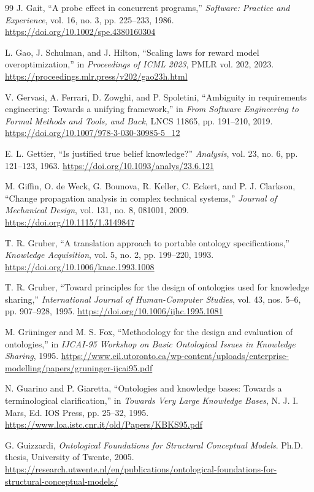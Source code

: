 \documentclass[10pt,a4paper]{article}
\begin{document}
\begin{thebibliography}{99}
J. Gait, ``A probe effect in concurrent programs,'' \emph{Software: Practice and Experience}, vol. 16, no. 3, pp. 225--233, 1986. \url{https://doi.org/10.1002/spe.4380160304}

L. Gao, J. Schulman, and J. Hilton, ``Scaling laws for reward model overoptimization,'' in \emph{Proceedings of ICML 2023}, PMLR vol. 202, 2023. \url{https://proceedings.mlr.press/v202/gao23h.html}

V. Gervasi, A. Ferrari, D. Zowghi, and P. Spoletini, ``Ambiguity in requirements engineering: Towards a unifying framework,'' in \emph{From Software Engineering to Formal Methods and Tools, and Back}, LNCS 11865, pp. 191--210, 2019. \url{https://doi.org/10.1007/978-3-030-30985-5_12}

E. L. Gettier, ``Is justified true belief knowledge?'' \emph{Analysis}, vol. 23, no. 6, pp. 121--123, 1963. \url{https://doi.org/10.1093/analys/23.6.121}

M. Giffin, O. de Weck, G. Bounova, R. Keller, C. Eckert, and P. J. Clarkson, ``Change propagation analysis in complex technical systems,'' \emph{Journal of Mechanical Design}, vol. 131, no. 8, 081001, 2009. \url{https://doi.org/10.1115/1.3149847}

T. R. Gruber, ``A translation approach to portable ontology specifications,'' \emph{Knowledge Acquisition}, vol. 5, no. 2, pp. 199--220, 1993. \url{https://doi.org/10.1006/knac.1993.1008}

T. R. Gruber, ``Toward principles for the design of ontologies used for knowledge sharing,'' \emph{International Journal of Human-Computer Studies}, vol. 43, nos. 5--6, pp. 907--928, 1995. \url{https://doi.org/10.1006/ijhc.1995.1081}

M. Gr\"uninger and M. S. Fox, ``Methodology for the design and evaluation of ontologies,'' in \emph{IJCAI-95 Workshop on Basic Ontological Issues in Knowledge Sharing}, 1995. \url{https://www.eil.utoronto.ca/wp-content/uploads/enterprise-modelling/papers/gruninger-ijcai95.pdf}

N. Guarino and P. Giaretta, ``Ontologies and knowledge bases: Towards a terminological clarification,'' in \emph{Towards Very Large Knowledge Bases}, N. J. I. Mars, Ed. IOS Press, pp. 25--32, 1995. \url{https://www.loa.istc.cnr.it/old/Papers/KBKS95.pdf}

G. Guizzardi, \emph{Ontological Foundations for Structural Conceptual Models}. Ph.D. thesis, University of Twente, 2005. \url{https://research.utwente.nl/en/publications/ontological-foundations-for-structural-conceptual-models/}


\end{thebibliography}
\end{document}
